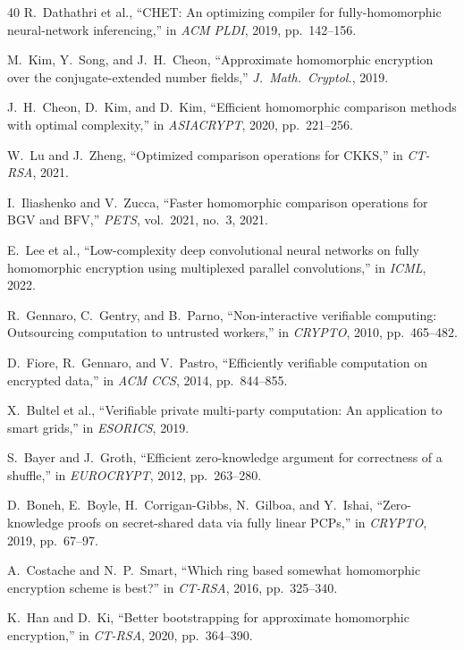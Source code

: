 \begin{thebibliography}{40}
R.~Dathathri et al., ``CHET: An optimizing compiler for fully-homomorphic neural-network inferencing,'' in \emph{ACM PLDI}, 2019, pp.~142--156.

M.~Kim, Y.~Song, and J.~H.~Cheon, ``Approximate homomorphic encryption over the conjugate-extended number fields,'' \emph{J.\ Math.\ Cryptol.}, 2019.

J.~H.~Cheon, D.~Kim, and D.~Kim, ``Efficient homomorphic comparison methods with optimal complexity,'' in \emph{ASIACRYPT}, 2020, pp.~221--256.

W.~Lu and J.~Zheng, ``Optimized comparison operations for CKKS,'' in \emph{CT-RSA}, 2021.

I.~Iliashenko and V.~Zucca, ``Faster homomorphic comparison operations for BGV and BFV,'' \emph{PETS}, vol.~2021, no.~3, 2021.

E.~Lee et al., ``Low-complexity deep convolutional neural networks on fully homomorphic encryption using multiplexed parallel convolutions,'' in \emph{ICML}, 2022.

R.~Gennaro, C.~Gentry, and B.~Parno, ``Non-interactive verifiable computing: Outsourcing computation to untrusted workers,'' in \emph{CRYPTO}, 2010, pp.~465--482.

D.~Fiore, R.~Gennaro, and V.~Pastro, ``Efficiently verifiable computation on encrypted data,'' in \emph{ACM CCS}, 2014, pp.~844--855.

X.~Bultel et al., ``Verifiable private multi-party computation: An application to smart grids,'' in \emph{ESORICS}, 2019.

S.~Bayer and J.~Groth, ``Efficient zero-knowledge argument for correctness of a shuffle,'' in \emph{EUROCRYPT}, 2012, pp.~263--280.

D.~Boneh, E.~Boyle, H.~Corrigan-Gibbs, N.~Gilboa, and Y.~Ishai, ``Zero-knowledge proofs on secret-shared data via fully linear PCPs,'' in \emph{CRYPTO}, 2019, pp.~67--97.

A.~Costache and N.~P.~Smart, ``Which ring based somewhat homomorphic encryption scheme is best?'' in \emph{CT-RSA}, 2016, pp.~325--340.

K.~Han and D.~Ki, ``Better bootstrapping for approximate homomorphic encryption,'' in \emph{CT-RSA}, 2020, pp.~364--390.


\end{thebibliography}
